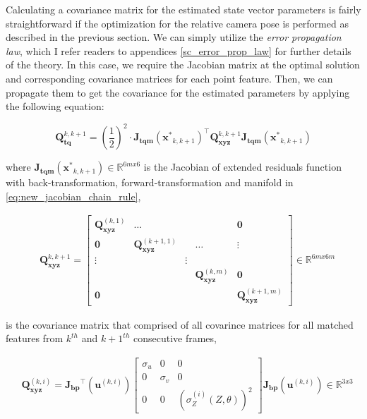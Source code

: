 \documentclass[a4paper]{report}
\numberwithin{figure}{section}
\newcommand{\R}{\mathbb{R}}
\begin{document}
Calculating a covariance matrix for the estimated state vector parameters is
fairly straightforward if the optimization for the relative camera pose is
performed as described in the previous section. We can simply utilize the
\textit{error propagation law}, which I refer readers to appendices
\ref{sc_error_prop_law} for further details of the theory.  In this case, we
require the Jacobian matrix at the optimal solution and corresponding
covariance  matrices for each point feature. Then, we can propagate them to get
the covariance for the estimated parameters by applying the following equation:

\begin{equation}\label{eq:cov_tq_prop} \mathbf{Q}_{\mathbf{tq}}^{k,k+1} =
(\frac{1}{2})^2 \cdot \mathbf{J_{tqm}}(\mathbf{x^*}_{k,k+1})^\top
\mathbf{Q}_{\mathbf{xyz}}^{k,k+1} \mathbf{J_{tqm}}(\mathbf{x^*}_{k,k+1})
\end{equation}

where $\mathbf{J_{tqm}}(\mathbf{x^*}_{k,k+1}) \in \R^{6mx6}$ is the Jacobian of
extended residuals function with back-transformation, forward-transformation 
and manifold
in \eqref{eq:new_jacobian_chain_rule},

\begin{equation} \begin{aligned} & \mathbf{Q}_{\mathbf{xyz}}^{k,k+1}  =
\begin{bmatrix} \mathbf{Q}_{\mathbf{xyz}}^{(k,1)} & \dots & & &\mathbf{0} \\
\mathbf{0} & \mathbf{Q}_{\mathbf{xyz}}^{(k+1,1)} & &\dots & \vdots  \\ \vdots &
& \vdots &  &\\ &  & & \mathbf{Q}_{\mathbf{xyz}}^{(k,m)} & \mathbf{0} \\
\mathbf{0} &  & & & \mathbf{Q}_{\mathbf{xyz}}^{(k+1,m)} \end{bmatrix} \in
\R^{6mx6m} \end{aligned} \end{equation}

is the covariance matrix that comprised of all covarince matrices for all
matched features from $k^{th}$ and $k+1^{th}$ consecutive frames,

\begin{equation}\label{eq:cov_xyz_prop} \begin{aligned} &
\mathbf{Q}_{\mathbf{xyz}}^{(k,i)} = 
\mathbf{J_{bp}}^\top(\mathbf{u}^{(k,i)})
\begin{bmatrix} \sigma_u & 0 & 0 \\ 0 & \sigma_v & 0 \\ 0 & 0 &
(\sigma_Z^{(i)}(Z, \theta))^2 \end{bmatrix} \mathbf{J_{bp}}(\mathbf{u}^{(k,i)})
\in \R^{3x3} \end{aligned} \end{equation}
\end{document}

